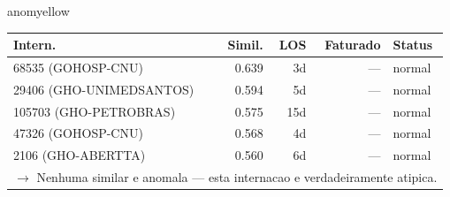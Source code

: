 \documentclass[a4paper,10pt]{article}
\begin{document}
\begin{anomalycard}[Internacao 167460 | GHO-PETROBRAS | MODERADO (z=2.90)]{anomyellow}
\begin{tabular}{l r r r l}\toprule\textbf{Intern.} & \textbf{Simil.} & \textbf{LOS} & \textbf{Faturado} & \textbf{Status} \\\midrule
68535 (GOHOSP-CNU) & 0.639 & 3d & --- & \textcolor{jcubeblue}{normal} \\
29406 (GHO-UNIMEDSANTOS) & 0.594 & 5d & --- & \textcolor{jcubeblue}{normal} \\
105703 (GHO-PETROBRAS) & 0.575 & 15d & --- & \textcolor{jcubeblue}{normal} \\
47326 (GOHOSP-CNU) & 0.568 & 4d & --- & \textcolor{jcubeblue}{normal} \\
2106 (GHO-ABERTTA) & 0.560 & 6d & --- & \textcolor{jcubeblue}{normal} \\
\multicolumn{5}{l}{\textcolor{jcubeblue}{\small $\rightarrow$ Nenhuma similar e anomala --- esta internacao e verdadeiramente atipica.}} \\
\bottomrule\end{tabular}


\end{anomalycard}

\newpage
\end{document}
